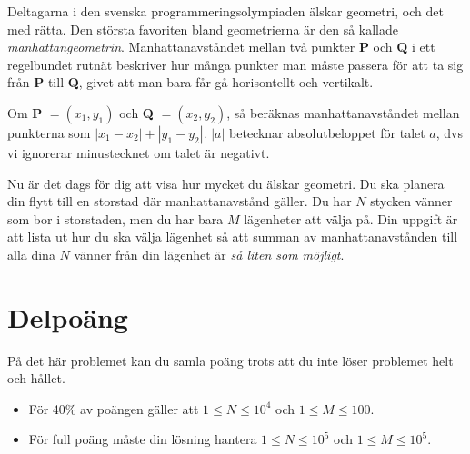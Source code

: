 
Deltagarna i den svenska programmeringsolympiaden älskar geometri, och det med rätta. Den största favoriten bland geometrierna är den så kallade \emph{manhattangeometrin}. Manhattanavståndet mellan två punkter \textbf{P} och \textbf{Q} i ett regelbundet rutnät beskriver hur många punkter man måste passera för att ta sig från \textbf{P} till \textbf{Q}, givet att man bara får gå horisontellt och vertikalt.

Om \textbf{P} $= (x_1,y_1)$ och \textbf{Q} $= (x_2,y_2)$, så beräknas manhattanavståndet mellan punkterna som $|x_1-x_2| + |y_1-y_2|$. $|a|$ betecknar absolutbeloppet för talet $a$, dvs vi ignorerar minustecknet om talet är negativt.

Nu är det dags för dig att visa hur mycket du älskar geometri. Du ska planera din flytt till en storstad där manhattanavstånd gäller. Du har $N$ stycken vänner som bor i storstaden, men du har bara $M$ lägenheter att välja på. Din uppgift är att lista ut hur du ska välja lägenhet så att summan av manhattanavstånden till alla dina $N$ vänner från din lägenhet är \emph{så liten som möjligt}.

\section*{Delpoäng}
På det här problemet kan du samla poäng trots att du inte löser problemet helt och hållet.

\begin{itemize}
\item För 40\% av poängen gäller att $1 \leq N \leq 10^4$ och $1 \leq M \leq 100$.
\item För full poäng måste din lösning hantera $1 \leq N \leq 10^5$ och $1\leq M \leq 10^5$.
\end{itemize}

